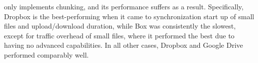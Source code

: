 only implements chunking, and its performance suffers as a result. Specifically, Dropbox is the best-performing when it came to synchronization start up of small files and upload/download duration, while Box was consistently the slowest, except for traffic overhead of small files, where it performed the best due to having no advanced capabilities. In all other cases, Dropbox and Google Drive performed comparably well. 
